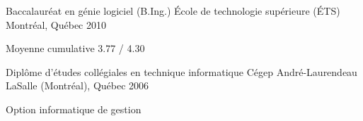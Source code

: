 
\begin{cventries}

  \cventry
    {Baccalauréat en génie logiciel (B.Ing.)} %
    {École de technologie supérieure (ÉTS)} %
    {Montréal, Québec} %
    {2010} %
    {
      \begin{cvitems} %
        \item {Moyenne cumulative 3.77 / 4.30}
      \end{cvitems}
    }

  \cventry
    {Diplôme d’études collégiales en technique informatique} %
    {Cégep André-Laurendeau} %
    {LaSalle (Montréal), Québec} %
    {2006} %
    {
      \begin{cvitems} %
        \item {Option informatique de gestion}
      \end{cvitems}
    }

\end{cventries}